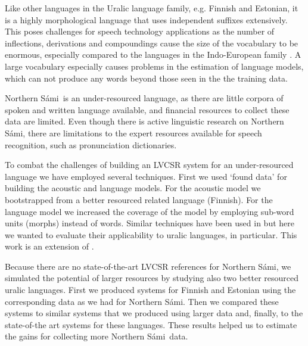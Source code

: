 \documentclass[b5paper]{article}
\newcommand{\ns}{Northern Sámi}
\begin{document}
Like other languages in the Uralic language family, e.g. Finnish and Estonian, it is a highly morphological language that uses independent suffixes extensively. This poses challenges for speech technology applications as the number of inflections, derivations and compoundings cause the size of the vocabulary to be enormous, especially compared to the languages in the Indo-European family \cite{karlsson1982}.  A large vocabulary especially causes problems in the estimation of language models, which can not produce any words beyond those seen in the the training data. 

\ns\ is an under-resourced language, as there are little corpora of spoken and written language available, and financial resources to collect these data are limited. Even though there is active linguistic research on \ns, there are limitations to the expert resources available for speech recognition, such as pronunciation dictionaries. 

To combat the challenges of building an LVCSR system for an under-resourced language we have employed several techniques. First we used `found data' for building the acoustic and language models. For the acoustic model we bootstrapped from a better resourced related language (Finnish). For the language model we increased the coverage of the model by employing sub-word units (morphs) instead of words. Similar techniques have been used in \cite{besacier2014automatic,viet2009} but here we wanted to evaluate their applicability to uralic languages, in particular. This work is an extension of \cite{leinonen2015}.


Because there are no state-of-the-art LVCSR references for \ns, we simulated the potential of larger resources by studying also two better resourced uralic languages. First we produced systems for Finnish and Estonian using the corresponding data as we had for \ns. Then we compared these systems to similar systems that we produced using larger data and, finally, to the state-of-the art systems for these languages. These results helped us to estimate the gains for collecting more \ns\ data.
\end{document}
